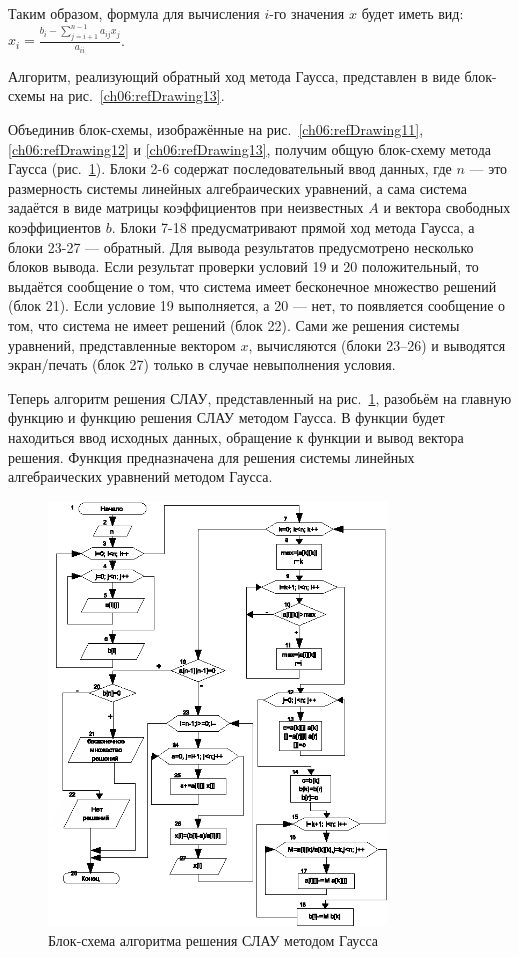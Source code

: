 Таким образом, формула для вычисления $i$-го значения $x$ будет иметь вид:
$x_i=\frac{b_i-\sum\limits_{j=i+1}^{n-1}{a_{ij}x_j}}{a_{ii}}$.

Алгоритм, реализующий обратный ход метода Гаусса, представлен в виде блок-схемы на рис.~\ref{ch06:refDrawing13}.


Объединив блок-схемы, изображённые на рис.~\ref{ch06:refDrawing11}, \ref{ch06:refDrawing12} и \ref{ch06:refDrawing13},
получим общую блок-схему метода Гаусса (рис.~\ref{ch06:refDrawing14}). Блоки 2-6 содержат последовательный ввод данных,
где $n$ --- это размерность системы линейных алгебраических уравнений, а сама система задаётся в виде матрицы коэффициентов
при неизвестных $A$ и вектора свободных коэффициентов $b$. Блоки 7-18 предусматривают прямой ход метода Гаусса, а блоки
23-27 --- обратный. Для вывода результатов предусмотрено несколько блоков вывода. Если результат проверки условий 19 и 20
положительный, то выдаётся сообщение о том, что система имеет бесконечное множество решений (блок 21). Если условие 19
выполняется, а 20 --- нет, то появляется сообщение о том, что система не имеет решений (блок 22). Сами же решения системы
уравнений, представленные вектором $x$, вычисляются (блоки 23–26) и выводятся экран/печать (блок 27) только в случае
невыполнения условия.

Теперь алгоритм решения СЛАУ, представленный на рис.~\ref{ch06:refDrawing14}, разобьём на главную функцию 
и функцию решения СЛАУ методом Гаусса. В функции  будет находиться ввод исходных данных, обращение к
функции  и вывод вектора решения. Функция  предназначена для
решения системы линейных алгебраических уравнений методом Гаусса.

\begin{figure}[htb]
\begin{center}
\includegraphics[width=0.8\textwidth]{img/ris_6_15}
\caption{Блок-схема алгоритма решения СЛАУ методом Гаусса}
\label{ch06:refDrawing14}
\end{center}
\end{figure}

